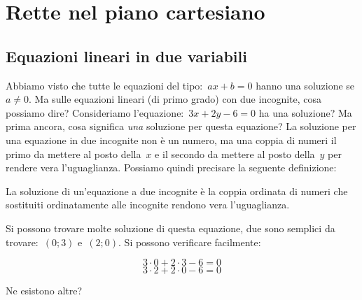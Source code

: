 
\chapter{Rette nel piano cartesiano}

\section{Equazioni lineari in due variabili}
\label{sec:retta_equazionilineari}

Abbiamo visto che tutte le equazioni del tipo:~$ax+b=0$ hanno una soluzione
se $a\neq0$. Ma sulle equazioni lineari (di primo grado) con due incognite, 
cosa possiamo dire? Consideriamo l'equazione:~$3x + 2y - 6 = 0$ 
ha una soluzione? Ma prima ancora, cosa significa \emph{una} soluzione per 
questa equazione? La soluzione per una equazione in due incognite  non è un 
numero, ma una coppia di numeri il primo da mettere al posto della~$x$ e il
secondo da mettere al posto della~$y$ per rendere vera l'uguaglianza.
Possiamo quindi precisare la seguente definizione:

\begin{definizione}
 La soluzione di un'equazione a due incognite è la coppia ordinata di numeri 
 che sostituiti ordinatamente alle incognite rendono vera l'uguaglianza.
\end{definizione}

Si possono trovare molte soluzione di questa equazione, due sono 
semplici da trovare:~$(0; 3)$ e~$(2; 0)$. Si possono verificare facilmente:

\[3 \cdot 0 + 2 \cdot 3 - 6 = 0\]
\[3 \cdot 2 + 2 \cdot 0 - 6 = 0\]

Ne esistono altre?


